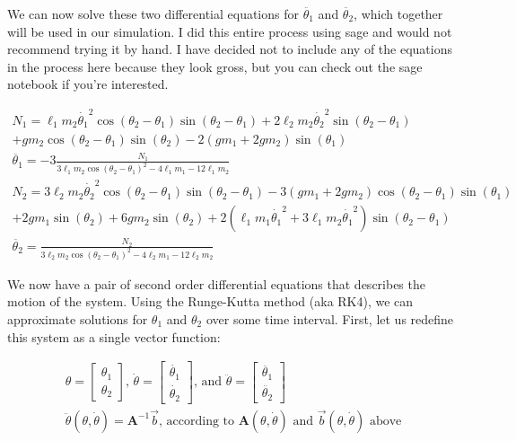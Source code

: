 \documentclass[]{article}
\begin{document}
We can now solve these two differential equations for $\ddot{\theta_1}$ and $\ddot{\theta_2}$, which together will be used in our simulation. I did this entire process using sage and would not recommend trying it by hand. I have decided not to include any of the equations in the process here because they look gross, but you can check out the sage notebook if you're interested.

\begin{gather*}
	N_1 = \ell_1 m_2 {\dot{\theta_1}}^{2} \cos({\theta_2} - {\theta_1}) \sin({\theta_2} - {\theta_1}) + 2  \ell_2 m_2 {\dot{\theta_2}}^{2} \sin({\theta_2} - {\theta_1}) \\ + g m_2 \cos({\theta_2} - {\theta_1}) \sin({\theta_2}) - 2  {(g m_1 + 2  g m_2)} \sin({\theta_1}) \\
	\ddot{\theta_1} = -3\frac{N_1}{3  \ell_1 m_2 \cos({\theta_2} - {\theta_1})^{2} - 4  \ell_1 m_1 - 12  \ell_1 m_2} \\
	N_2 = 3  \ell_2 m_2 {\dot{\theta_2}}^{2} \cos({\theta_2} - {\theta_1}) \sin({\theta_2} - {\theta_1}) - 3  {(g m_1 + 2  g m_2)} \cos({\theta_2} - {\theta_1}) \sin({\theta_1}) \\ + 2  g m_1 \sin({\theta_2}) + 6  g m_2 \sin({\theta_2}) + 2  {(\ell_1 m_1 {\dot{\theta_1}}^{2} + 3  \ell_1 m_2 {\dot{\theta_1}}^{2})} \sin({\theta_2} - {\theta_1}) \\
	\ddot{\theta_2} = \frac{N_2}{3  \ell_2 m_2 \cos({\theta_2} - {\theta_1})^{2} - 4  \ell_2 m_1 - 12  \ell_2 m_2}
\end{gather*}

We now have a pair of second order differential equations that describes the motion of the system. Using the Runge-Kutta method (aka RK4), we can approximate solutions for $\theta_1$ and $\theta_2$ over some time interval. First, let us redefine this system as a single vector function:

\begin{gather*}
	\theta = 
	\begin{bmatrix}
		\theta_1 \\
		\theta_2
	\end{bmatrix} \text{, }
	\dot{\theta} = 
	\begin{bmatrix}
		\dot{\theta_1} \\
		\dot{\theta_2}
	\end{bmatrix} \text{, and }
	\ddot{\theta} =
	\begin{bmatrix}
		\ddot{\theta_1} \\
		\ddot{\theta_2}
	\end{bmatrix} \\
	\ddot{\theta}(\theta, \dot{\theta}) = \boldsymbol{A}^{-1}\vec{b}\text{, according to $\boldsymbol{A}(\theta, \dot{\theta})$ and $\vec{b}(\theta, \dot{\theta})$ above}
\end{gather*}
\end{document}
